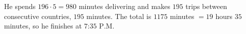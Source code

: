 He spends $196\cdot5=980$ minutes delivering and makes $195$ trips between consecutive countries, $195$ minutes. The total is $1175$ minutes $=19$ hours $35$ minutes, so he finishes at $\boxed{\text{7:35 P.M.}}$
